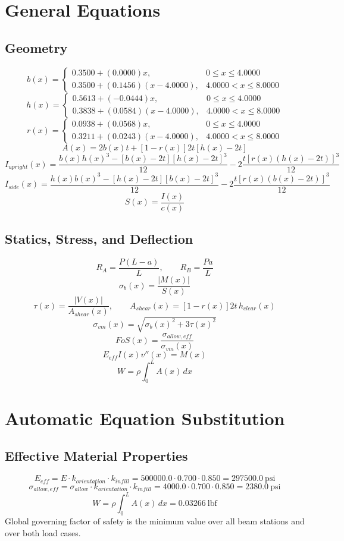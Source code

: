 \documentclass[11pt]{article}
\begin{document}
\section*{General Equations}
\subsection*{Geometry}
\[
b(x)=\begin{cases}0.3500 + (0.0000)x, & 0 \le x \le 4.0000\\0.3500 + (0.1456)(x-4.0000), & 4.0000 < x \le 8.0000\end{cases}
\]
\[
h(x)=\begin{cases}0.5613 + (-0.0444)x, & 0 \le x \le 4.0000\\0.3838 + (0.0584)(x-4.0000), & 4.0000 < x \le 8.0000\end{cases}
\]
\[
r(x)=\begin{cases}0.0938 + (0.0568)x, & 0 \le x \le 4.0000\\0.3211 + (0.0243)(x-4.0000), & 4.0000 < x \le 8.0000\end{cases}
\]
\[
A(x)=2b(x)t+[1-r(x)]2t[h(x)-2t]
\]
\[
I_{upright}(x)=\frac{b(x)h(x)^3-[b(x)-2t][h(x)-2t]^3}{12}-2\frac{t[r(x)(h(x)-2t)]^3}{12}
\]
\[
I_{side}(x)=\frac{h(x)b(x)^3-[h(x)-2t][b(x)-2t]^3}{12}-2\frac{t[r(x)(b(x)-2t)]^3}{12}
\]
\[
S(x)=\frac{I(x)}{c(x)}
\]

\subsection*{Statics, Stress, and Deflection}
\[
R_A=\frac{P(L-a)}{L}, \qquad R_B=\frac{Pa}{L}
\]
\[
\sigma_b(x)=\frac{|M(x)|}{S(x)}
\]
\[
\tau(x)=\frac{|V(x)|}{A_{shear}(x)}, \qquad A_{shear}(x)=[1-r(x)]2t\,h_{clear}(x)
\]
\[
\sigma_{vm}(x)=\sqrt{\sigma_b(x)^2+3\tau(x)^2}
\]
\[
FoS(x)=\frac{\sigma_{allow,eff}}{\sigma_{vm}(x)}
\]
\[
E_{eff}I(x)v''(x)=M(x)
\]
\[
W=\rho\int_0^L A(x)\,dx
\]

\section*{Automatic Equation Substitution}
\subsection*{Effective Material Properties}
\[E_{eff} = E \cdot k_{orientation} \cdot k_{infill} = 500000.0 \cdot 0.700 \cdot 0.850 = 297500.0\ \mathrm{psi}\]
\[\sigma_{allow,eff} = \sigma_{allow} \cdot k_{orientation} \cdot k_{infill} = 4000.0 \cdot 0.700 \cdot 0.850 = 2380.0\ \mathrm{psi}\]
\[W = \rho \int_0^L A(x)\,dx = 0.03266\ \mathrm{lbf}\]
Global governing factor of safety is the minimum value over all beam stations and over both load cases.
\end{document}

